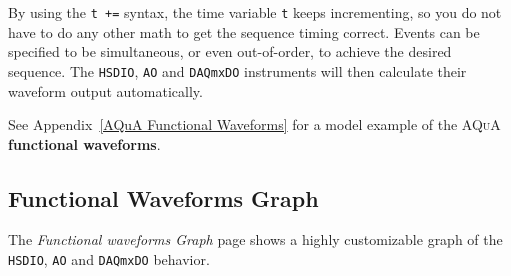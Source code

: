 \documentclass[pdftex,11pt,letterpaper]{article}
\begin{document}
By using the \texttt{t +=} syntax, the time variable \texttt{t} keeps incrementing, so you do not have to do any other math to get the sequence timing correct.  Events can be specified to be simultaneous, or even out-of-order, to achieve the desired sequence.  The \texttt{HSDIO}, \texttt{AO} and \texttt{DAQmxDO} instruments will then calculate their waveform output automatically.

See Appendix~\ref{AQuA Functional Waveforms} for a model example of the \textsc{AQuA} \textbf{functional waveforms}.

\subsection{Functional Waveforms Graph}

The \textit{Functional waveforms Graph} page shows a highly customizable graph of the \texttt{HSDIO}, \texttt{AO} and \texttt{DAQmxDO} behavior.
\end{document}
